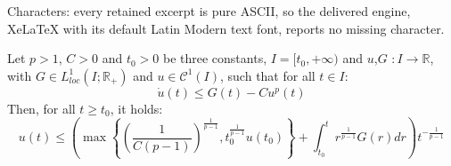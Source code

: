 \documentclass[10pt,a4paper]{amsart}
\newcommand{\R}{\mathbb{R}}	%
\begin{document}
Characters: every retained excerpt is pure ASCII, so the delivered engine, XeLaTeX with its default Latin Modern text font, reports no missing character.
\begin{lemma}\label{lemma nonlinear gronwall power p}
Let $p>1$, $C>0$ and $t_{0}>0$ be three constants, $I=[t_{0},+\infty)$ and $u$,$G$ $:I\longrightarrow \R$, with $G\in L^{1}_{loc}(I;\R_{+})$ and $u\in\mathcal{C}^{1}(I)$, such that for all $t\in I$:
	\begin{equation}\label{relation nonlinear gronwall appendix}
		\dot{u}(t) \leq G(t) - Cu^{p}(t)
	\end{equation}
	Then, for all $t\geq t_{0}$, it holds:
\begin{equation}\label{bound nonlinear gronwall appendix}
	u(t) \leq \left(\max\left\{ \left(\frac{1}{C(p-1)}\right)^{\frac{1}{p-1}}, t_{0}^{\frac{1}{p-1}}u(t_{0}) \right\} + \int_{t_{0}}^{t}r^{\frac{1}{p-1}}G(r)dr \right)t^{-\frac{1}{p-1}}
\end{equation}
\end{lemma}
\end{document}
